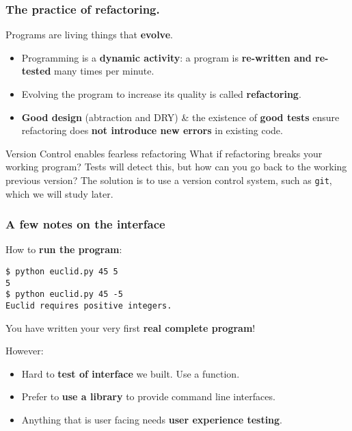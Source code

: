 \documentclass{beamer} %
\newcommand\emc[1]{\textcolor{brightblue}{\textbf{#1}}}
\begin{document}
\begin{frame}
\frametitle{The practice of refactoring.}

Programs are living things that \emc{evolve}.
\begin{itemize}
\item Programming is a \emc{dynamic activity}: a program is \emc{re-written and re-tested} many times per minute.
\item Evolving the program to increase its quality is called \emc{refactoring}.
\item \emc{Good design} (abtraction and DRY) \& the existence of \emc{good tests} ensure refactoring does \emc{not introduce new errors} in existing code.
\end{itemize}

\begin{block}{Version Control enables fearless refactoring}
What if refactoring breaks your working program? Tests will detect this, but how can you go back to the working previous version? The solution is to use a version control system, such as \texttt{git}, which we will study later.
\end{block}

\end{frame}


\begin{frame}[fragile]
\frametitle{A few notes on the interface}

How to \emc{run the program}:
\begin{center}
\begin{Verbatim}[fontsize=\scriptsize]
$ python euclid.py 45 5
5
$ python euclid.py 45 -5
Euclid requires positive integers.
\end{Verbatim}
\end{center}
You have written your very first \emc{real complete program}!

\vspace{3mm}
However:
\begin{itemize}
	\item Hard to \emc{test of interface} we built. Use a function.
	\item Prefer to \emc{use a library} to provide command line interfaces.
	\item Anything that is user facing needs \emc{user experience testing}.
\end{itemize}

\end{frame}
\end{document}
